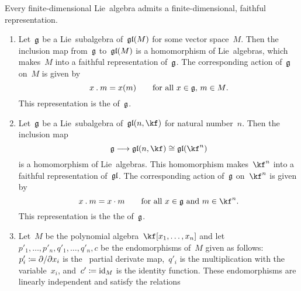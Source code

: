 \begin{theorem}
	Every finite-dimensional Lie~algebra admits a finite-\hspace{0pt}dimensional, faithful representation.
\end{theorem}


\begin{examples}
	\label{examples for representations}
	\leavevmode
	\begin{enumerate}
		\item
			Let~$\mathfrak{g}$ be a Lie~subalgebra of~$\mathfrak{gl}(M)$ for some vector space~$M$.
			Then the inclusion map from~$\mathfrak{g}$ to~$\mathfrak{gl}(M)$ is a homomorphism of Lie~algebras, which makes~$M$ into a faithful representation of~$\mathfrak{g}$.
			The corresponding action of~$\mathfrak{g}$ on~$M$ is given by
			\[
				x \mathbin{.} m
				=
				x(m)
				\qquad
				\text{for all~$x \in \mathfrak{g}$,~$m \in M$.}
			\]
			This representation is the  of~$\mathfrak{g}$.
		\item
			Let~$\mathfrak{g}$ be a Lie~subalgebra of~$\gllie(n, \kf)$ for natural number~$n$.
			Then the inclusion map
			\[
				\glie
				\to
				\gllie(n, \kf)
				\cong
				\gllie(\kf^n)
			\]
			is a homomorphism of Lie~algebras.
			This homomorphism makes~$\kf^n$ into a faithful representation of~$\mathfrak{gl}$.
			The corresponding action of~$\mathfrak{g}$ on~$\kf^n$ is given by
			\[
				x \act m
				=
				x \cdot m
				\qquad
				\text{for all~$x \in \glie$ and~$m \in \kf^n$.}
			\]
			This representation is the the  of~$\mathfrak{g}$.
		\item
			Let~$M$ be the polynomial algebra~$\kf[x_1, \dotsc, x_n]$ and let~$p'_1, \dotsc, p'_n, q'_1, \dotsc, q'_n, c$ be the endomorphisms of~$M$ given as follows:
			$p'_i \defined \dd{x_i}$ is the~{} partial derivate map,~$q'_i$ is the multiplication with the variable~$x_i$, and~$c' \coloneqq \mathrm{id}_M$ is the identity function.
			These endomorphisms are linearly independent and satisfy the relations

\end{enumerate}
\end{examples}
